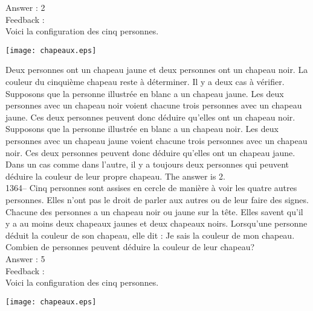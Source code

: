 ﻿\documentclass[letterpaper, 12pt]{article}
\begin{document}
Answer : 2\\

Feedback : \\
Voici la configuration des cinq personnes.
    \begin{center}
    \texttt{[image: chapeaux.eps]}
    \end{center}

Deux personnes ont un chapeau jaune et deux personnes ont un chapeau noir.
La couleur du cinqui\`eme chapeau reste \`a d\'eterminer.  Il y a deux cas
\`a v\'erifier.\\

Supposons que la personne illustr\'ee en blanc a un chapeau jaune.  Les deux
personnes avec un chapeau noir voient chacune trois personnes avec un
chapeau jaune.  Ces deux personnes peuvent donc d\'eduire qu'elles ont un
chapeau noir.  \\
Supposons que la personne illustr\'ee en blanc a un chapeau noir.  Les deux
personnes avec un chapeau jaune voient chacune trois personnes avec un
chapeau noir.  Ces deux personnes peuvent donc d\'eduire qu'elles ont un
chapeau jaune.  \\
Dans un cas comme dans l'autre, il y a toujours deux personnes qui peuvent
d\'eduire la couleur de leur propre chapeau.  The answer is 2.\\

1364-- Cinq personnes sont assises en cercle de mani\`ere \`a voir
les quatre autres personnes.  Elles n'ont pas le droit de parler aux
autres ou de leur faire des signes.  Chacune des personnes a un
chapeau noir ou jaune sur la t\^ete.  Elles savent qu'il y a au
moins deux chapeaux jaunes et deux chapeaux noirs.  Lorsqu'une
personne d\'eduit la couleur de son chapeau, elle dit : \og Je sais
la couleur de mon chapeau\fg .  Combien de personnes
peuvent d\'eduire la couleur de leur chapeau?\\

Answer : 5\\

Feedback : \\
Voici la configuration des cinq personnes.
    \begin{center}
    \texttt{[image: chapeaux.eps]}
    \end{center}
\end{document}
